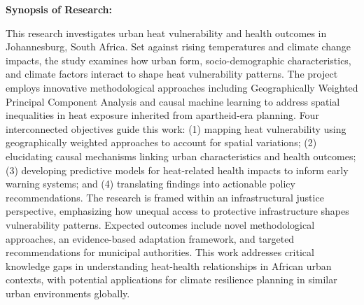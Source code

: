 \vspace{0.5cm}

\textbf{Synopsis of Research:}

This research investigates urban heat vulnerability and health outcomes in Johannesburg, South Africa. Set against rising temperatures and climate change impacts, the study examines how urban form, socio-demographic characteristics, and climate factors interact to shape heat vulnerability patterns. The project employs innovative methodological approaches including Geographically Weighted Principal Component Analysis and causal machine learning to address spatial inequalities in heat exposure inherited from apartheid-era planning. Four interconnected objectives guide this work: (1) mapping heat vulnerability using geographically weighted approaches to account for spatial variations; (2) elucidating causal mechanisms linking urban characteristics and health outcomes; (3) developing predictive models for heat-related health impacts to inform early warning systems; and (4) translating findings into actionable policy recommendations. The research is framed within an infrastructural justice perspective, emphasizing how unequal access to protective infrastructure shapes vulnerability patterns. Expected outcomes include novel methodological approaches, an evidence-based adaptation framework, and targeted recommendations for municipal authorities. This work addresses critical knowledge gaps in understanding heat-health relationships in African urban contexts, with potential applications for climate resilience planning in similar urban environments globally.

